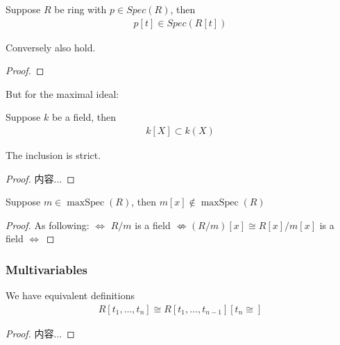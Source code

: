 \documentclass[Total.tex]{subfiles}
\begin{document}
			\begin{proposition}
				Suppose $R$ be ring with $p\in Spec(R)$, then
				\begin{gather*}
					p[t]\in Spec(R[t])
				\end{gather*}
				
				Conversely also hold. 
			\end{proposition}
			\begin{proof}
				
			\end{proof}
			
			But for the maximal ideal:
			
			\begin{lemma}
				Suppose $k$ be a field, then
				\begin{gather*}
					k[X]\subset k(X)
				\end{gather*}
				
				The inclusion is strict. 
			\end{lemma}
			\begin{proof}
				内容...
			\end{proof}
			
			\begin{proposition}
				Suppose $m\in \operatorname{maxSpec}(R)$, then $m[x]\notin \operatorname{maxSpec}(R)$
			\end{proposition}
			\begin{proof}
				As following: $\Leftrightarrow$ $R/m$ is a field $\not\Leftrightarrow (R/m)[x]\cong R[x]/m[x]$ is a field $\Leftrightarrow$ 
			\end{proof}
			
			\subsubsection{Multivariables}
			\begin{proposition}
				We have equivalent definitions
				\begin{gather*}
					R[t_1,\dots,t_n]\cong R[t_1,\dots,t_{n-1}][t_n\cong ]
				\end{gather*}
			\end{proposition}
			\begin{proof}
				内容...
			\end{proof}
			
\end{document}
